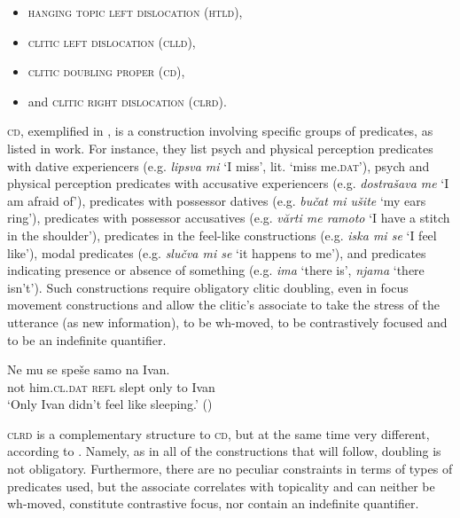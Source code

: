 \documentclass[output=paper,
colorlinks,
citecolor=brown,
newtxmath
]{langscibook}
\begin{document}
\begin{itemize}
\item \textsc{hanging topic left dislocation} (\textsc{htld}),
\item \textsc{clitic left dislocation} (\textsc{clld}),
\item \textsc{clitic doubling proper} (\textsc{cd}),
\item and \textsc{clitic right dislocation} (\textsc{clrd}).
\end{itemize}

\textsc{cd}, exemplified in , is a construction involving specific groups of predicates, as listed in  work. For instance, they list psych and physical perception predicates with dative experiencers (e.g. \textit{lipsva mi} `I miss', lit. `miss me.\textsc{dat}'), psych and physical perception predicates with accusative experiencers (e.g. \textit{dostrašava me} `I am afraid of'), predicates with possessor datives (e.g. \textit{bučat mi ušite} `my ears ring'), predicates with possessor accusatives (e.g. \textit{vărti me ramoto} `I have a stitch in the shoulder'), predicates in the feel-like constructions (e.g. \textit{iska mi se} `I feel like'), modal predicates (e.g. \textit{slučva mi se} `it happens to me'), and predicates indicating presence or absence of something (e.g. \textit{ima} `there is', \textit{njama} `there isn’t'). Such constructions require obligatory clitic doubling, even in focus movement constructions and allow the clitic’s associate to take the stress of the utterance (as new information), to be wh-moved, to be contrastively focused and to be an indefinite quantifier.


\ea\label{ex:zivojinovic:6}
\gll Ne  mu          se   speše samo na Ivan.\\
     not him.\textsc{cl.dat} \textsc{refl} slept only to Ivan \\
\glt `Only Ivan didn't feel like sleeping.'
\hfill ()
\z

\noindent \textsc{clrd} is a complementary structure to \textsc{cd}, but at the same time very different, according to \citet{Cinque.Krapova2008}. Namely, as in all of the constructions that will follow, doubling is not obligatory. Furthermore, there are no peculiar constraints in terms of types of predicates used, but the associate correlates with topicality and can neither be wh-moved, constitute contrastive focus, nor contain an indefinite quantifier.
\end{document}
